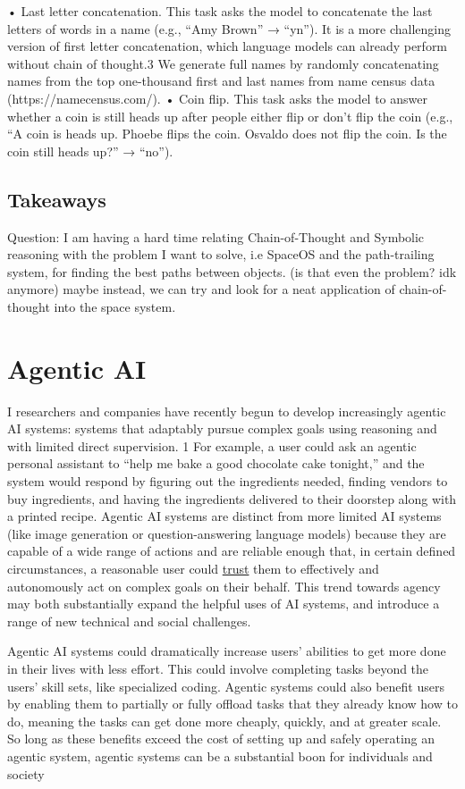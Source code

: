 \documentclass[10pt,a4paper]{article}
\begin{document}
\begin{multicols}{2}
• Last letter concatenation. This task asks the model
to concatenate the last letters of words in a name (e.g.,
“Amy Brown” → “yn”). It is a more challenging version
of first letter concatenation, which language models can
already perform without chain of thought.3 We generate
full names by randomly concatenating names from the
top one-thousand first and last names from name census
data (https://namecensus.com/).
• Coin flip. This task asks the model to answer whether a
coin is still heads up after people either flip or don’t flip
the coin (e.g., “A coin is heads up. Phoebe flips the coin.
Osvaldo does not flip the coin. Is the coin still heads up?”
→ “no”).

\subsection*{Takeaways}

Question: I am having a hard time relating Chain-of-Thought and Symbolic reasoning with the problem I want to solve, i.e SpaceOS and the path-trailing system, for finding the best paths between objects. (is that even the problem? idk anymore) maybe instead, we can try and look for a neat application of chain-of-thought into the space system. 


    \section*{Agentic AI}

    I researchers and companies have recently begun to develop increasingly agentic AI systems:
systems that adaptably pursue complex goals using reasoning and with limited direct supervision. 1
For example, a user could ask an agentic personal assistant to “help me bake a good chocolate cake
tonight,” and the system would respond by figuring out the ingredients needed, finding vendors
to buy ingredients, and having the ingredients delivered to their doorstep along with a printed
recipe. Agentic AI systems are distinct from more limited AI systems (like image generation or
question-answering language models) because they are capable of a wide range of actions and
are reliable enough that, in certain defined circumstances, a reasonable user could \underline{trust} them to
effectively and autonomously act on complex goals on their behalf. This trend towards agency may
both substantially expand the helpful uses of AI systems, and introduce a range of new technical
and social challenges.

Agentic AI systems could dramatically increase users’ abilities to get more done in their lives
with less effort. This could involve completing tasks beyond the users’ skill sets, like specialized
coding. Agentic systems could also benefit users by enabling them to partially or fully offload tasks
that they already know how to do, meaning the tasks can get done more cheaply, quickly, and at
greater scale. So long as these benefits exceed the cost of setting up and safely operating an agentic
system, agentic systems can be a substantial boon for individuals and society


\end{multicols}
\end{document}
